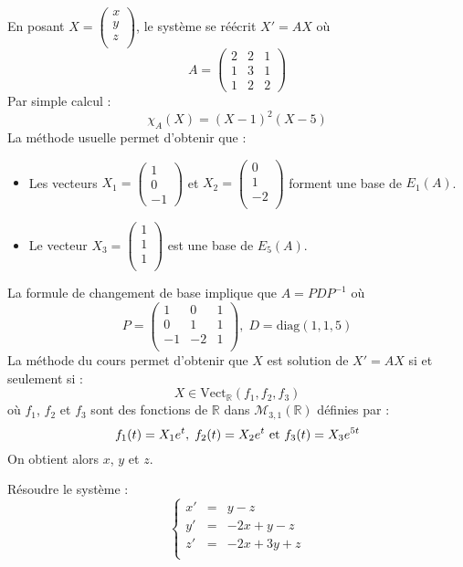 \documentclass[a4paper,10pt]{report}
\begin{document}
\corr En posant $X = \begin{pmatrix}
x \\
y \\
z \\
\end{pmatrix}$, le système se réécrit $X'=AX$ où 
$$A= \left(\begin{array}{rrr}  2 & 2 & 1\\
1 & 3 & 1\\
1 & 2 & 2 \end{array}\right)$$
Par simple calcul :
$$ \chi_A(X)= (X-1)^2 (X-5)$$
La méthode usuelle permet d'obtenir que :
\begin{itemize}
\item Les vecteurs $X_1=\begin{pmatrix}
1 \\
0 \\
-1
\end{pmatrix}$ et $X_2=\begin{pmatrix}
0\\
1 \\
-2 \\
\end{pmatrix}$ forment une base de $E_1(A)$.
\item Le vecteur $X_3=\begin{pmatrix}
1 \\
1 \\
1 \\
\end{pmatrix}$ est une base de $E_5(A)$.
\end{itemize}
La formule de changement de base implique que $A=PDP^{-1}$ où 
$$ P = \begin{pmatrix}
1& 0 & 1 \\
0& 1 & 1 \\
-1 & -2 & 1 \\
\end{pmatrix}, \; D= \textrm{diag}(1,1,5)$$
La méthode du cours permet d'obtenir que $X$ est solution de $X'=AX$ si et seulement si :
$$X \in \textrm{Vect}_{\mathbb{R}} (f_1,f_2,f_3)$$
où $f_1$, $f_2$ et $f_3$ sont des fonctions de $\mathbb{R}$ dans $\mathcal{M}_{3,1}(\mathbb{R})$ définies par :
$$ f_1(t)= X_1 e^{t}, \; f_2(t) = X_2 e^{t} \hbox{ et } f_3(t) =X_3 e^{5t} $$
On obtient alors $x$, $y$ et $z$.


\begin{Exa} Résoudre le système :
$$ \left\lbrace \begin{array}{ccl}
x' & = & y-z \\
y' & = &-2x+y-z \\
z' & =& -2x+3y+z \\
\end{array}\right.$$
\end{Exa}
\end{document}

